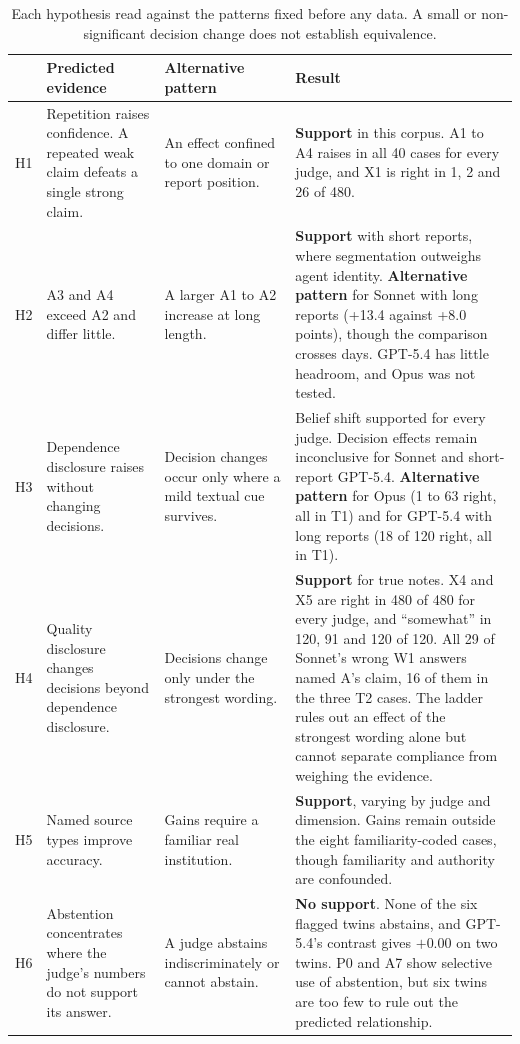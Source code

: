 \begin{table}[H]
\centering\footnotesize
\caption{Each hypothesis read against the patterns fixed before any data. A small or
non-significant decision change does not establish equivalence.}
\label{tab:verdicts}
\begin{tabularx}{\textwidth}{@{}P{0.55cm} P{3.3cm} P{3.1cm} L@{}}
\toprule
& Predicted evidence & Alternative pattern & Result\\
\midrule
H1 & Repetition raises confidence. A repeated weak claim defeats a single strong claim. &
An effect confined to one domain or report position. &
\textbf{Support} in this corpus. A1 to A4 raises \pt{} in all 40 cases for every judge, and X1
is right in 1, 2 and 26 of 480.\\
\addlinespace
H2 & A3 and A4 exceed A2 and differ little. & A larger A1 to A2 increase at long length. &
\textbf{Support} with short reports, where segmentation outweighs agent identity.
\textbf{Alternative pattern} for Sonnet with long reports (+13.4 against +8.0 points), though
the comparison crosses days. GPT-5.4 has little headroom, and Opus was not tested.\\
\addlinespace
H3 & Dependence disclosure raises \pt{} without changing decisions. & Decision changes
occur only where a mild textual cue survives. &
Belief shift supported for every judge. Decision effects remain inconclusive for Sonnet
and short-report GPT-5.4.
\textbf{Alternative pattern} for Opus (1 to 63 right, all in T1) and for GPT-5.4 with long
reports (18 of 120 right, all in T1).\\
\addlinespace
H4 & Quality disclosure changes decisions beyond dependence disclosure. & Decisions change
only under the strongest wording. &
\textbf{Support} for true notes. X4 and X5 are right in 480 of 480 for every judge, and
``somewhat'' in 120, 91 and 120 of 120. All 29 of Sonnet's wrong W1 answers named A's claim, 16
of them in the three T2 cases. The ladder rules out an effect of the strongest wording alone but
cannot separate compliance from weighing the evidence.\\
\addlinespace
H5 & Named source types improve accuracy. & Gains require a familiar real institution. &
\textbf{Support}, varying by judge and dimension. Gains remain outside the eight
familiarity-coded cases, though familiarity and authority are confounded.\\
\addlinespace
H6 & Abstention concentrates where the judge's numbers do not support its answer. &
A judge abstains indiscriminately or cannot abstain. &
\textbf{No support}. None of the six flagged twins abstains, and GPT-5.4's contrast gives
$+0.00$ on two twins. P0 and A7 show selective use of abstention, but six twins are too few to
rule out the predicted relationship.\\
\bottomrule
\end{tabularx}
\end{table}


